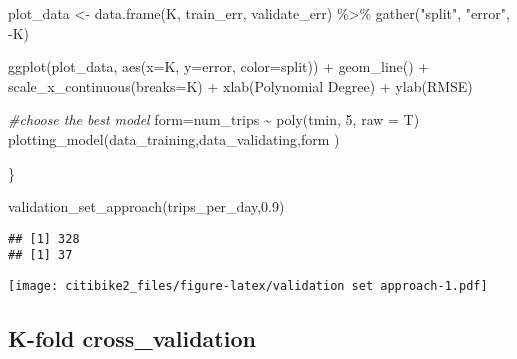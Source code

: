 \documentclass[
]{article}
\newenvironment{Shaded}{\begin{snugshade}}{\end{snugshade}}
\newcommand{\AttributeTok}[1]{\textcolor[rgb]{0.77,0.63,0.00}{#1}}
\newcommand{\CommentTok}[1]{\textcolor[rgb]{0.56,0.35,0.01}{\textit{#1}}}
\newcommand{\DecValTok}[1]{\textcolor[rgb]{0.00,0.00,0.81}{#1}}
\newcommand{\FloatTok}[1]{\textcolor[rgb]{0.00,0.00,0.81}{#1}}
\newcommand{\FunctionTok}[1]{\textcolor[rgb]{0.00,0.00,0.00}{#1}}
\newcommand{\NormalTok}[1]{#1}
\newcommand{\OtherTok}[1]{\textcolor[rgb]{0.56,0.35,0.01}{#1}}
\newcommand{\SpecialCharTok}[1]{\textcolor[rgb]{0.00,0.00,0.00}{#1}}
\newcommand{\StringTok}[1]{\textcolor[rgb]{0.31,0.60,0.02}{#1}}
\begin{document}
\begin{Shaded}
\begin{Highlighting}[]
\NormalTok{  plot\_data }\OtherTok{\textless{}{-}} \FunctionTok{data.frame}\NormalTok{(K, train\_err, validate\_err) }\SpecialCharTok{\%\textgreater{}\%}
    \FunctionTok{gather}\NormalTok{(}\StringTok{"split"}\NormalTok{, }\StringTok{"error"}\NormalTok{, }\SpecialCharTok{{-}}\NormalTok{K)}
  
  \FunctionTok{ggplot}\NormalTok{(plot\_data, }\FunctionTok{aes}\NormalTok{(}\AttributeTok{x=}\NormalTok{K, }\AttributeTok{y=}\NormalTok{error, }\AttributeTok{color=}\NormalTok{split)) }\SpecialCharTok{+}
    \FunctionTok{geom\_line}\NormalTok{() }\SpecialCharTok{+}
    \FunctionTok{scale\_x\_continuous}\NormalTok{(}\AttributeTok{breaks=}\NormalTok{K) }\SpecialCharTok{+}
    \FunctionTok{xlab}\NormalTok{(}\StringTok{\textquotesingle{}Polynomial Degree\textquotesingle{}}\NormalTok{) }\SpecialCharTok{+}
    \FunctionTok{ylab}\NormalTok{(}\StringTok{\textquotesingle{}RMSE\textquotesingle{}}\NormalTok{)}
  
  \CommentTok{\#choose the best model}
\NormalTok{  form}\OtherTok{=}\NormalTok{num\_trips }\SpecialCharTok{\textasciitilde{}} \FunctionTok{poly}\NormalTok{(tmin, }\DecValTok{5}\NormalTok{, }\AttributeTok{raw =}\NormalTok{ T)}
  \FunctionTok{plotting\_model}\NormalTok{(data\_training,data\_validating,form )}
  
\NormalTok{\}}

\FunctionTok{validation\_set\_approach}\NormalTok{(trips\_per\_day,}\FloatTok{0.9}\NormalTok{)}
\end{Highlighting}
\end{Shaded}

\begin{verbatim}
## [1] 328
## [1] 37
\end{verbatim}

\texttt{[image: citibike2\_files/figure-latex/validation set approach-1.pdf]}

\hypertarget{k-fold-cross_validation}{%
\subsection{K-fold cross\_validation}\label{k-fold-cross_validation}}
\end{document}
